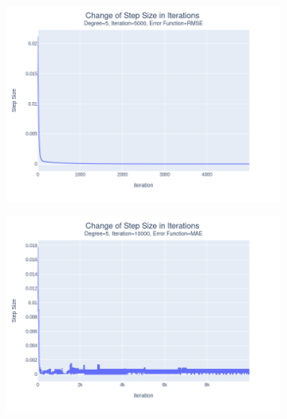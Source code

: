 \documentclass[14pt,a4]{article}
\begin{document}
\begin{figure}[h]
    \hfill
    \begin{subfigure}{0.3\linewidth}
        \centering
        \includegraphics[width=\textwidth]{images/implementation/q1/part_d/step_size/5_5000_RMSE.png}
    \end{subfigure}
    \newline
    \begin{subfigure}{0.3\linewidth}
        \centering
        \includegraphics[width=\textwidth]{images/implementation/q1/part_d/step_size/5_10000_MAE.png}
    \end{subfigure}
    \hfill
    \begin{subfigure}{0.3\textwidth}
        \centering

\end{subfigure}
\end{figure}
\end{document}
